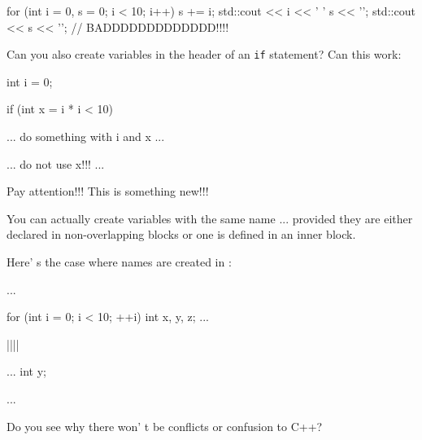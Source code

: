 \begin{console}
for (int i = 0, s = 0; i < 10; i++)
{   
    s += i;
    std::cout << i << ' ' s << '\n';
}
std::cout << s << '\n'; // BADDDDDDDDDDDDD!!!!
\end{console}

\begin{ex}Can you also create variables in the header of an \texttt{if} statement? Can this work:

\begin{console}
int i = 0;

if (int x = i * i < 10)
{   

    ... do something with i and x ...

}
     ... do not use x!!! ...
\end{console}
\end{ex}
\newpage{}

Pay attention!!! This is something new!!!

You can actually create variables with the same name ... provided they
are either declared in non-overlapping blocks or one is defined in an
inner block.

Here' s the case where names are created in :

\begin{consolethree}[escapeinside=||]
...

for (int i = 0; i < 10; ++i)
{   
     int x, y, z;
     ...
}

||||
{   
     ...
     int y;

}

... 
\end{consolethree}

Do you see why there won' t be conflicts or confusion to C++?

